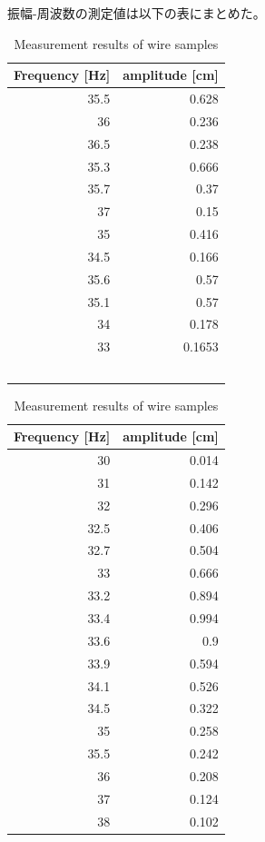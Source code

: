 \documentclass[a4paper,11pt]{jsarticle}
\begin{document}
振幅-周波数の測定値は以下の表にまとめた。
\begin{table}[H]
  \begin{minipage}{0.5\hsize}
    \centering
    \caption{Measurement results for plate samples}
      \begin{tabular}{rr}
      \multicolumn{1}{l}{Frequency [Hz]} & \multicolumn{1}{l}{amplitude [cm]} \\
      \midrule
      35.5  & 0.628 \\
      36    & 0.236 \\
      36.5  & 0.238 \\
      35.3  & 0.666 \\
      35.7  & 0.37 \\
      37    & 0.15 \\
      35    & 0.416 \\
      34.5  & 0.166 \\
      35.6  & 0.57 \\
      35.1  & 0.57 \\
      34    & 0.178 \\
      33    & 0.1653 \\
      &  \\
      &  \\
      &  \\
      &  \\
      &  \\

      \end{tabular}%
  \label{tab:addlabel}%
  \end{minipage}
  \begin{minipage}{0.5\hsize}
    \centering
    \caption{Measurement results of wire samples}
    \begin{tabular}{rr}
    \multicolumn{1}{l}{Frequency [Hz]} & \multicolumn{1}{l}{amplitude [cm]} \\
    \midrule
    30    & 0.014 \\
    31    & 0.142 \\
    32    & 0.296 \\
    32.5  & 0.406 \\
    32.7  & 0.504 \\
    33    & 0.666 \\
    33.2  & 0.894 \\
    33.4  & 0.994 \\
    33.6  & 0.9 \\
    33.9  & 0.594 \\
    34.1  & 0.526 \\
    34.5  & 0.322 \\
    35    & 0.258 \\
    35.5  & 0.242 \\
    36    & 0.208 \\
    37    & 0.124 \\
    38    & 0.102 \\
    \end{tabular}%
  \end{minipage} 
\end{table}%
\end{document}
